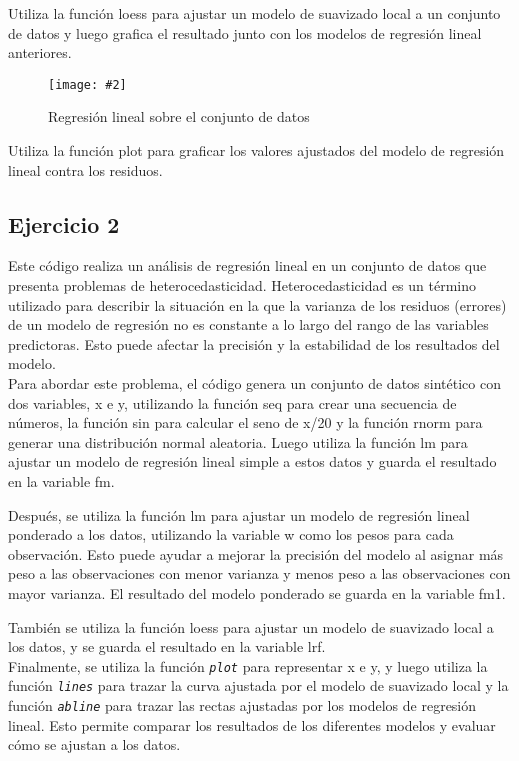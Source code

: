 \documentclass[
12pt, 
spanish, 
singlespacing,
headsepline
]{article}
\newcommand{\smallimage}[2]{
\begin{figure}[H]
	\caption{#1}
	\centering
	\texttt{[image: \#2]}
\end{figure}
}
\newcommand{\code}[1]{\textit{\texttt{#1}}}
\begin{document}
Utiliza la función loess para ajustar un modelo de suavizado local a un conjunto de datos y luego grafica el resultado junto con los modelos de regresión lineal anteriores.

\smallimage{Regresión lineal sobre el conjunto de datos}{R/linearregression.png}

Utiliza la función plot para graficar los valores ajustados del modelo de regresión lineal contra los residuos.

\subsection{Ejercicio 2}
Este código realiza un análisis de regresión lineal en un conjunto de datos que presenta problemas de heterocedasticidad. Heterocedasticidad es un término utilizado para describir la situación en la que la varianza de los residuos (errores) de un modelo de regresión no es constante a lo largo del rango de las variables predictoras. Esto puede afectar la precisión y la estabilidad de los resultados del modelo.
\\

Para abordar este problema, el código genera un conjunto de datos sintético con dos variables, x e y, utilizando la función seq para crear una secuencia de números, la función sin para calcular el seno de x/20 y la función rnorm para generar una distribución normal aleatoria. Luego utiliza la función lm para ajustar un modelo de regresión lineal simple a estos datos y guarda el resultado en la variable fm.

Después, se utiliza la función lm para ajustar un modelo de regresión lineal ponderado a los datos, utilizando la variable w como los pesos para cada observación. Esto puede ayudar a mejorar la precisión del modelo al asignar más peso a las observaciones con menor varianza y menos peso a las observaciones con mayor varianza. El resultado del modelo ponderado se guarda en la variable fm1.

También se utiliza la función loess para ajustar un modelo de suavizado local a los datos, y se guarda el resultado en la variable lrf.
\\

Finalmente, se utiliza la función \code{plot} para representar x e y, y luego utiliza la función \code{lines} para trazar la curva ajustada por el modelo de suavizado local y la función \code{abline} para trazar las rectas ajustadas por los modelos de regresión lineal. Esto permite comparar los resultados de los diferentes modelos y evaluar cómo se ajustan a los datos.
\end{document}
